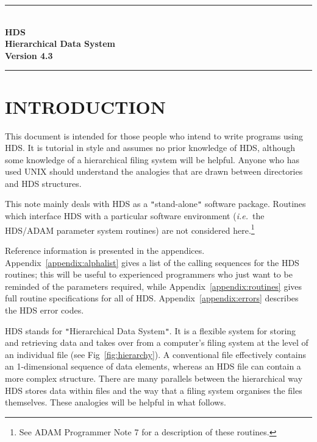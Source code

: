 \documentclass[11pt]{article}
\newcommand{\stardocinitials}  {SUN}
\newcommand{\stardocnumber}    {92.11}
\newcommand{\stardoctitle}     {HDS\\ [1ex]
                                Hierarchical Data System}
\newcommand{\stardocversion}   {Version 4.3}
\newcommand{\stardocname}{\stardocinitials /\stardocnumber}
\newenvironment{latexonly}{}{}
\newcommand{\xref}[3]{#1}
\newcommand{\xlabel}[1]{}
\newcommand{\qt}[1]{``#1''}
\newcommand{\st}[1]{{\em{#1}}}
\renewcommand{\qt}[1]{{\tt{"}}#1{\tt{"}}}
\begin{document}
\begin{latexonly}
   \newpage
   \markright{\stardocname}
   \renewcommand{\thepage}{\arabic{page}}
   \setcounter{page}{1}
   \null\vspace{5mm}
   \begin{center}
   \rule{80mm}{0.5mm}\\[1ex]
   {\Large\bf \stardoctitle\\[2.5ex]
              \stardocversion}\\[2ex]
   \rule{80mm}{0.5mm}
   \end{center}
   \vspace{30mm}
\end{latexonly}

\section {\xlabel{introduction}INTRODUCTION}

This document is intended for those people who intend to write
programs using HDS. It is tutorial in style and assumes no prior
knowledge of HDS, although some knowledge of a hierarchical filing
system will be helpful. Anyone who has used UNIX should understand the
analogies that are drawn between directories and HDS structures.

This note mainly deals with HDS as a \qt{stand-alone} software
package. Routines which interface HDS with a particular software
environment (\st{i.e.}\ the HDS/\xref{ADAM}{sg4}{} parameter system
routines) are not considered here.\footnote{See ADAM Programmer Note 7
for a description of these routines.}

Reference information is presented in the appendices.
Appendix~\ref{appendix:alphalist} gives a list of the calling
sequences for the HDS routines; this will be useful to experienced
programmers who just want to be reminded of the parameters required,
while Appendix~\ref{appendix:routines} gives full routine
specifications for all of HDS.  Appendix~\ref{appendix:errors}
describes the HDS error codes.

HDS stands for \qt{Hierarchical Data System}. It is a flexible system
for storing and retrieving data and takes over from a computer's
filing system at the level of an individual file (see
Fig~\ref{fig:hierarchy}). A conventional file effectively contains an
1-dimensional sequence of data elements, whereas an HDS file can
contain a more complex structure. There are many parallels between the
hierarchical way HDS stores data within files and the way that a
filing system organises the files themselves. These analogies will be
helpful in what follows.
\end{document}
